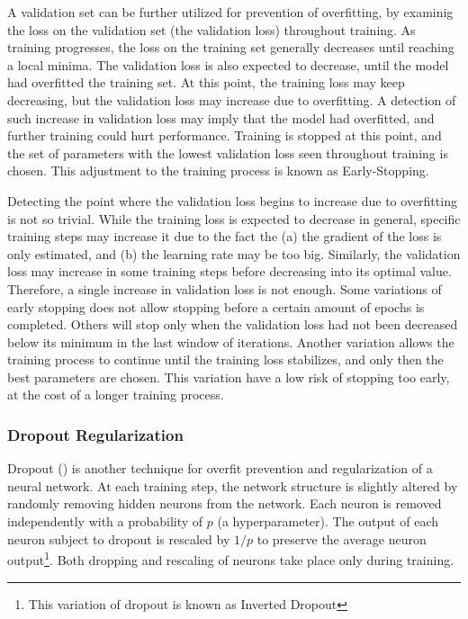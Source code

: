 A validation set can be further utilized for prevention of overfitting, by examinig the loss on the validation set (the validation loss) throughout training. As training progresses, the loss on the training set generally decreases until reaching a local minima. The validation loss is also expected to decrease, until the model had overfitted the training set. At this point, the training loss may keep decreasing, but the validation loss may increase due to overfitting. A detection of such increase in validation loss may imply that the model had overfitted, and further training could hurt performance. Training is stopped at this point, and the set of parameters with the lowest validation loss seen throughout training is chosen. This adjustment to the training process is known as Early-Stopping. 

Detecting the point where the validation loss begins to increase due to overfitting is not so trivial. While the training loss is expected to decrease in general, specific training steps may increase it due to the fact the (a) the gradient of the loss is only estimated, and (b) the learning rate may be too big. Similarly, the validation loss may increase in some training steps before decreasing into its optimal value. Therefore, a single increase in validation loss is not enough. Some variations of early stopping does not allow stopping before a certain amount of epochs is completed. Others will stop only when the validation loss had not been decreased below its minimum in the last window of iterations. Another variation allows the training process to continue until the training loss stabilizes, and only then the best parameters are chosen. This variation have a low risk of stopping too early, at the cost of a longer training process.

\subsubsection{Dropout Regularization}

Dropout (\cite{dropout}) is another technique for overfit prevention and regularization of a neural network. At each training step, the network structure is slightly altered by randomly removing hidden neurons from the network. Each neuron is removed independently with a probability of $p$ (a hyperparameter). The output of each neuron subject to dropout is rescaled by $1/p$ to preserve the average neuron output\footnote{This variation of dropout is known as Inverted Dropout}. Both dropping and rescaling of neurons take place only during training. 


